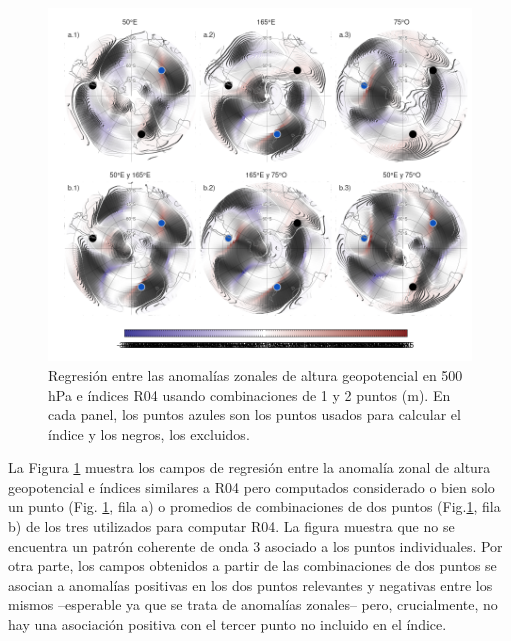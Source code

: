 \documentclass[12pt,oneside,a4paper]{reedthesis}
\begin{document}
\begin{figure}

{\centering \includegraphics{figures/15-onda3/cor-puntos-1} 

}

\caption{Regresión entre las anomalías zonales de altura geopotencial en 500 hPa e índices R04 usando combinaciones de 1 y 2 puntos (m). En cada panel, los puntos azules son los puntos usados para calcular el índice y los negros, los excluidos.}\label{fig:cor-puntos}
\end{figure}



La Figura \ref{fig:cor-puntos} muestra los campos de regresión entre la anomalía zonal de altura geopotencial e índices similares a R04 pero computados considerado o bien solo un punto (Fig. \ref{fig:cor-puntos}, fila a) o promedios de combinaciones de dos puntos (Fig.\ref{fig:cor-puntos}, fila b) de los tres utilizados para computar R04.
La figura muestra que no se encuentra un patrón coherente de onda 3 asociado a los puntos individuales.
Por otra parte, los campos obtenidos a partir de las combinaciones de dos puntos se asocian a anomalías positivas en los dos puntos relevantes y negativas entre los mismos --esperable ya que se trata de anomalías zonales-- pero, crucialmente, no hay una asociación positiva con el tercer punto no incluido en el índice.
\end{document}
